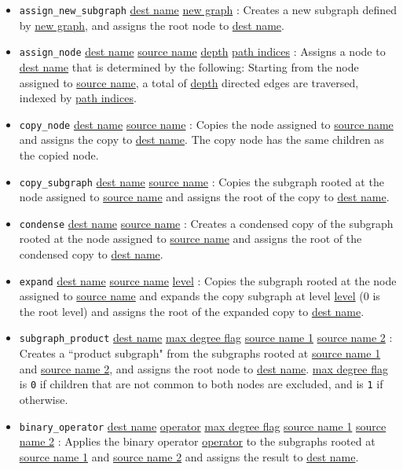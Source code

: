 \documentclass{article}
\begin{document}
\begin{itemize}
\item \texttt{assign\_new\_subgraph} \underline{dest name} \underline{new graph} : Creates a new subgraph defined by \underline{new graph}, and assigns the root node to \underline{dest name}.
%
\item \texttt{assign\_node} \underline{dest name} \underline{source name} \underline{depth} \underline{path indices} : Assigns a node to \underline{dest name} that is determined by the following: Starting from the node assigned to \underline{source name}, a total of \underline{depth} directed edges are traversed, indexed by \underline{path indices}. 
%
\item \texttt{copy\_node} \underline{dest name} \underline{source name} : Copies the node assigned to \underline{source name} and assigns the copy to \underline{dest name}. The copy node has the same children as the copied node.
%
\item \texttt{copy\_subgraph} \underline{dest name} \underline{source name} : Copies the subgraph rooted at the node assigned to \underline{source name} and assigns the root of the copy to \underline{dest name}.
%
\item \texttt{condense} \underline{dest name} \underline{source name} : Creates a condensed copy of the subgraph rooted at the node assigned to \underline{source name} and assigns the root of the condensed copy to \underline{dest name}.
%
\item \texttt{expand} \underline{dest name} \underline{source name} \underline{level} : Copies the subgraph rooted at the node assigned to \underline{source name} and expands the copy subgraph at level \underline{level} (0 is the root level) and assigns the root of the expanded copy to \underline{dest name}.
%
\item \texttt{subgraph\_product} \underline{dest name} \underline{max degree flag} \underline{source name 1} \underline{source name 2} : Creates a ``product subgraph" from the subgraphs rooted at \underline{source name 1} and \underline{source name 2}, and assigns the root node to \underline{dest name}. \underline{max degree flag} is \texttt{0} if children that are not common to both nodes are excluded, and is \texttt{1} if otherwise.  
% 
\item \texttt{binary\_operator} \underline{dest name} \underline{operator} \underline{max degree flag} \underline{source name 1} \underline{source name 2} : Applies the binary operator \underline{operator} to the subgraphs rooted at \underline{source name 1} and \underline{source name 2} and assigns the result to \underline{dest name}. 

\end{itemize}
\end{document}
